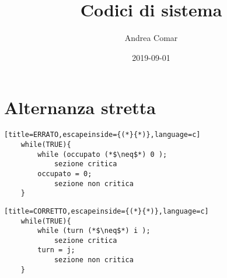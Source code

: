 \documentclass{article}
\title{Codici di sistema}
\author{Andrea Comar}
\date{2019-09-01}
\begin{document}
\maketitle
\tableofcontents

\newpage

\section{Alternanza stretta}

\noindent\begin{minipage}{.45\textwidth}
    \begin{lstlisting}[title=ERRATO,escapeinside={(*}{*)},language=c]
    while(TRUE){
        while (occupato (*$\neq$*) 0 );
            sezione critica
        occupato = 0;
            sezione non critica
    }
    \end{lstlisting}
    \end{minipage}\hfill
    \begin{minipage}{.45\textwidth}
    \begin{lstlisting}[title=CORRETTO,escapeinside={(*}{*)},language=c]
    while(TRUE){
        while (turn (*$\neq$*) i );
            sezione critica
        turn = j;
            sezione non critica
    }
    \end{lstlisting}
    \end{minipage}
    
    
\end{document}
